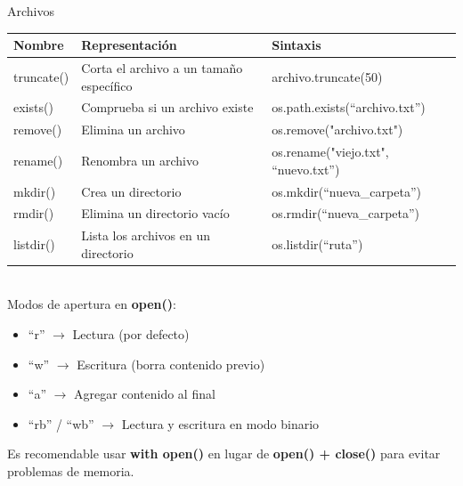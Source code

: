 \documentclass[11pt]{beamer}
\begin{document}
\begin{frame}{Archivos}
	\scriptsize
	\begin{tabularx}{\linewidth}{
			>{\raggedright\arraybackslash}p{2cm}   %
			>{\raggedright\arraybackslash}X        %
			>{\raggedright\arraybackslash}X        %
		}
		\toprule
		\textbf{Nombre} & \textbf{Representación} & \textbf{Sintaxis} \\
		\midrule
		truncate() & Corta el archivo a un tamaño específico & archivo.truncate(50) \\
		exists() & Comprueba si un archivo existe & os.path.exists(``archivo.txt'') \\
		remove() & Elimina un archivo & os.remove("archivo.txt") \\
		rename() & Renombra un archivo & os.rename("viejo.txt", ``nuevo.txt'') \\
		mkdir() & Crea un directorio & os.mkdir(``nueva\_carpeta'') \\
		rmdir() & Elimina un directorio vacío & os.rmdir(``nueva\_carpeta'') \\
		listdir() & Lista los archivos en un directorio & os.listdir(``ruta'') \\
		\bottomrule 
	\end{tabularx}\\
	\vspace{.3cm}
	Modos de apertura en \textbf{open()}:
	\vspace{.2cm}
	\begin{itemize}
		\item ``r'' $\rightarrow$ Lectura (por defecto)
		\item ``w'' $\rightarrow$ Escritura (borra contenido previo)
		\item ``a'' $\rightarrow$ Agregar contenido al final
		\item ``rb'' / ``wb'' $\rightarrow$ Lectura y escritura en modo binario 
	\end{itemize}
	\vspace{.2cm}
	Es recomendable usar \textbf{with open()} en lugar de \textbf{open() + close()} para evitar problemas de memoria.
	
\end{frame}
\end{document}
